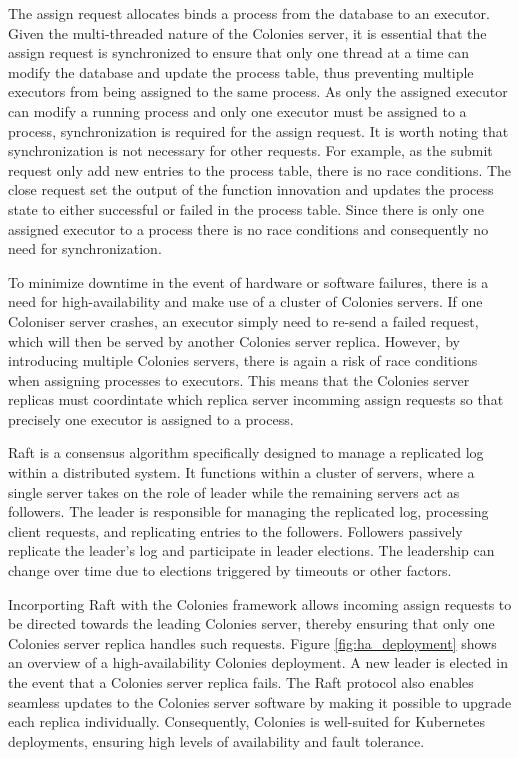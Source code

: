 \documentclass{article}
\begin{document}
The assign request allocates binds a process from the database to an executor. Given the multi-threaded nature of the Colonies server, it is essential that the assign request is synchronized to ensure that only one thread at a time can modify the database and update the process table, thus preventing multiple executors from being assigned to the same process. As only the assigned executor can modify a running process and only one executor must be assigned to a process, synchronization is required for the assign request. It is worth noting that synchronization is not necessary for other requests. For example, as the submit request only add new entries to the process table, there is no race conditions. The close request set the output of the function innovation and updates the process state to either successful or failed in the process table. Since there is only one assigned executor to a process there is no race conditions and consequently no need for synchronization.

To minimize downtime in the event of hardware or software failures, there is a need for high-availability and make use of a cluster of Colonies servers. If one Coloniser server crashes, an executor simply need to re-send a failed request, which will then be served by another Colonies server replica. However, by introducing multiple Colonies servers, there is again a risk of race conditions when assigning processes to executors. This means that the Colonies server replicas must coordintate which replica server incomming assign requests so that precisely one executor is assigned to a process.

Raft \cite{raft} is a consensus algorithm specifically designed to manage a replicated log within a distributed system. It functions within a cluster of servers, where a single server takes on the role of leader while the remaining servers act as followers. The leader is responsible for managing the replicated log, processing client requests, and replicating entries to the followers. Followers passively replicate the leader's log and participate in leader elections. The leadership can change over time due to elections triggered by timeouts or other factors.

Incorporting Raft with the Colonies framework allows incoming assign requests to be directed towards the leading Colonies server, thereby ensuring that only one Colonies server replica handles such requests. Figure \ref{fig:ha_deployment} shows an overview of a high-availability Colonies deployment. A new leader is elected in the event that a Colonies server replica fails. The Raft protocol also enables seamless updates to the Colonies server software by making it possible to upgrade each replica individually. Consequently, Colonies is well-suited for Kubernetes deployments, ensuring high levels of availability and fault tolerance.
\end{document}
